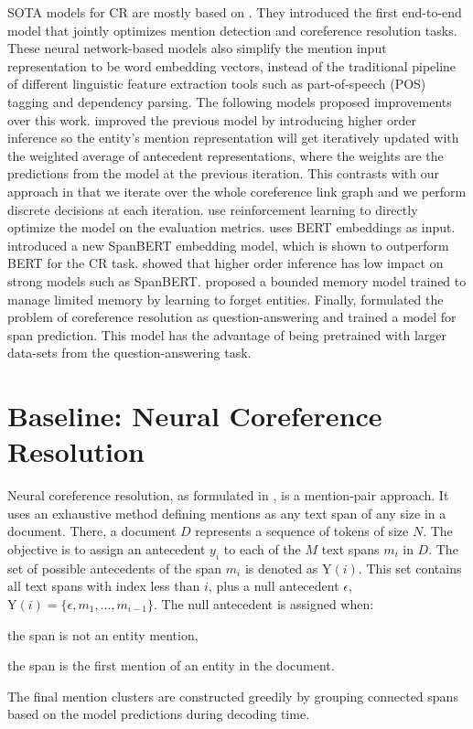 \documentclass[11pt]{article}
\begin{document}
SOTA models for CR are mostly based on \citet{lee-etal-2017-end}. They introduced the first end-to-end model that jointly optimizes mention detection and coreference resolution tasks. These neural network-based models also simplify the mention input representation to be word embedding vectors, instead of the traditional pipeline of different linguistic feature extraction tools such as part-of-speech (POS) tagging and dependency parsing. The following models proposed improvements over this work.  \cite{lee-etal-2018-higher} improved the previous model by introducing higher order inference so the entity's mention representation will get iteratively updated with the weighted average of antecedent representations, where the weights are the predictions from the model at the previous iteration. This contrasts with our approach in that we iterate over the whole coreference link graph and we perform discrete decisions at each iteration. \citet{fei-etal-2019-end} use reinforcement learning to directly optimize the model on the evaluation metrics. \citet{joshi-etal-2019-bert} uses BERT embeddings \cite{devlin-etal-2019-bert} as input. \citet{joshi-etal-2020-spanbert} introduced a new SpanBERT embedding model, which is shown to outperform BERT for the CR task. \citet{xu-choi-2020-revealing} showed that higher order inference has low impact on strong models such as SpanBERT.  \citet{toshniwal-etal-2020-learning} proposed a bounded memory model trained to manage limited memory by learning to forget entities. Finally, \citet{wu-etal-2020-corefqa} formulated the problem of coreference resolution as question-answering and trained a model for span prediction. This model has the advantage of being pretrained with larger data-sets from the question-answering task.
 


\section{Baseline: Neural Coreference Resolution} 
\label{sec:coreference:base}

Neural coreference resolution, as formulated in \cite{lee-etal-2017-end, lee-etal-2018-higher}, is a mention-pair approach. It uses an exhaustive method defining mentions as any text span of any size in a document. There, a document $D$  represents a sequence of tokens of size $N$. The objective is to assign an antecedent $y_i$ to each of the $M$ text spans $m_i$ in $D$.  The set of possible antecedents of the span $m_i$ is denoted as  $\mathrm{Y}(i)$. This set contains all text spans with index less than $i$, plus a null antecedent $\epsilon$, $\mathrm{Y}(i) = \{\epsilon, m_1, ...,m_{i-1} \}$. The null antecedent is assigned when:
\begin{enumerate*}[(\alph*)]
	\item the span is not an entity mention,
	\item the span is the first mention of an entity in the document.
\end{enumerate*}
The final mention clusters are constructed greedily by grouping connected spans based on the model predictions during decoding time.
\end{document}
